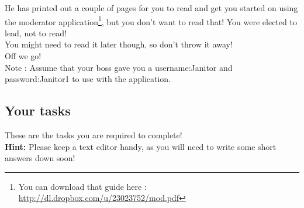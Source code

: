 \documentclass[12pt]{article}
\begin{document}
He has printed out a couple of pages for you to read and get you started on using the moderator application\footnote{You can download that guide here : \href{http://dl.dropbox.com/u/23023752/mod.pdf}{http://dl.dropbox.com/u/23023752/mod.pdf}}, but you don't want to read that! You were elected to lead, not to read!\\

You might need to read it later though, so don't throw it away!\\

Off we go!\\

Note : Assume that your boss gave you a username:Janitor and password:Janitor1 to use with the application.

\pagebreak
\subsection{Your tasks}
These are the tasks you are required to complete! \\
\textbf{Hint:} Please keep a text editor handy, as you will need to write some short answers down soon!
\end{document}
